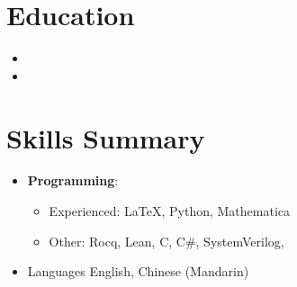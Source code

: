 \documentclass{curriculum-vitae}
\author{Ian Chi}
\begin{document}
\maketitle

\section{Education}
\begin{itemize}
  \item
  \item
    {}
\end{itemize}

\section{Skills Summary}
\begin{itemize}
  \item
    \textbf{Programming}:

    \begin{itemize}
      \item Experienced: \LaTeX, Python, Mathematica

      \item Other: Rocq, Lean, C, C\#, SystemVerilog,
    \end{itemize}

  \item
    \begin{itemshortlist}{Languages}
      English, Chinese (Mandarin)
    \end{itemshortlist}

\end{itemize}
\end{document}
